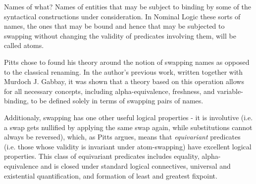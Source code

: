 \documentclass[english, mgr]{iithesis}
\renewcommand{\it}[1]{\textit{#1}}
\begin{document}
\begin{mdframed}[frametitle={\textnormal{\footnotesize \textbf{\citeauthor{nominal-logic}}, \textit{\citetitle{nominal-logic}}\cite{nominal-logic}:}}]
Names of what? Names of entities that may be subject to binding by some of
the syntactical constructions under consideration. In Nominal Logic these sorts of
names, the ones that may be bound and hence that may be subjected to swapping
without changing the validity of predicates involving them, will be called atoms.
\end{mdframed}

Pitts chose to found his theory around the notion of swapping names
as opposed to the classical renaming.
In the author's previous work\cite{abstract-syntax-variable-binding}, written together with Murdoch J. Gabbay,
it was shown that a theory based on this operation allows for all necessary concepts,
including alpha-equivalence, freshness, and variable-binding,
to be defined solely in terms of swapping pairs of names.

Additionaly, swapping has one other useful logical properties - it is involutive
(i.e. a swap gets nullified by applying the same swap again, while substitutions cannot always be reversed),
which, as Pitts argues, means that \it{equivariant} predicates (i.e. those whose validity is invariant under atom-swapping)
have excellent logical properties.
This class of equivariant predicates includes equality, alpha-equivalence and is
closed under standard logical connectives, universal and existential quantification,
and formation of least and greatest fixpoint.
\end{document}

